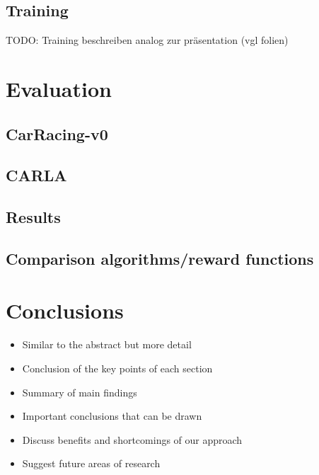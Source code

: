 \documentclass[letterpaper, 10 pt, conference]{ieeeconf}  %
\begin{document}
\subsection{Training}
TODO: Training beschreiben analog zur präsentation (vgl folien)


\section{Evaluation}

\subsection{CarRacing-v0}
\subsection{CARLA}

\subsection{Results}
\subsection{Comparison algorithms/reward functions}

\section{Conclusions}

\begin{itemize}
      \item Similar to the abstract but more detail
      \item Conclusion of the key points of each section
      \item Summary of main findings
      \item Important conclusions that can be drawn
      \item Discuss benefits and shortcomings of our approach
      \item Suggest future areas of research
   \end{itemize}


\addtolength{\textheight}{-12cm}   %
\end{document}
